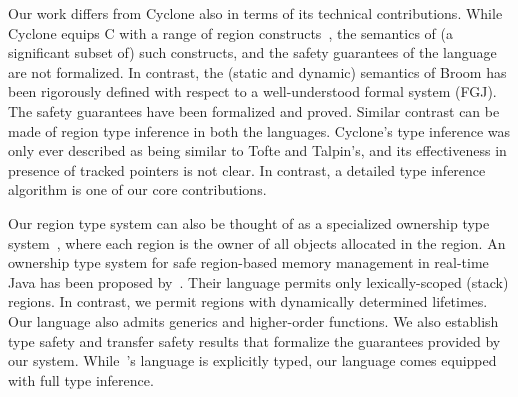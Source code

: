 Our work differs from Cyclone also in terms of its technical
contributions. While Cyclone equips C with a range of region
constructs~\cite{cycloneSCP}, the semantics of (a significant subset
of) such constructs, and the safety guarantees of the language are not
formalized. In contrast, the (static and dynamic) semantics of Broom
has been rigorously defined with respect to a well-understood formal
system (FGJ). The safety guarantees have been formalized and proved.
Similar contrast can be made of region type inference in both the languages.
Cyclone's type inference was only ever described as being similar to
Tofte and Talpin's, and its effectiveness in presence of tracked
pointers is not clear.
In contrast, a detailed type inference algorithm is one of our core contributions.

Our region type system can also be thought of as a specialized
ownership type system~\cite{OwnershipSurvey}, where each region is the
owner of all objects allocated in the region.
%
An ownership type system for safe region-based memory management in
real-time Java has been proposed by~\cite{MIT03}.  
Their language permits only lexically-scoped (stack) regions.
In contrast, we permit regions with dynamically determined lifetimes.
Our language also admits generics and higher-order functions.
We also establish type safety and transfer safety results that
formalize the guarantees provided by our system. While~\cite{MIT03}'s
language is explicitly typed, our language comes equipped with full
type inference.


